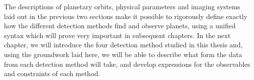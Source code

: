 \bigskip
\bigskip

The descriptions of planetary orbits, physical parameters and imaging systems laid out in the previous two sections make it possible to rigorously define exactly how the different detection methods find and observe planets, using a unified syntax which will prove very important in subsequent chapters.  In the next chapter, we will introduce the four detection method studied in this thesis and, using the groundwork laid here, we will be able to describe what form the data from each detection method will take, and develop expressions for the observables and constraints of each method. 



 






